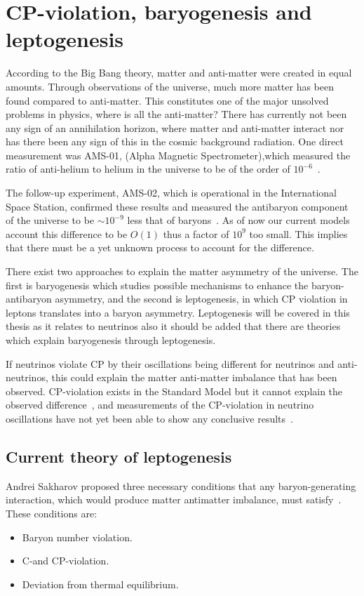 \pagebreak
\section{CP-violation, baryogenesis and leptogenesis}
According to the Big Bang theory, matter and anti-matter were created in equal amounts\cite{14Berry}. Through observations of the universe, much more matter has been found compared to anti-matter. This constitutes one of the major unsolved problems in physics, where is all the anti-matter? There has currently not been any sign of an annihilation horizon, where matter and anti-matter interact nor has there been any sign of this in the cosmic background radiation\cite{14Berry}. One direct measurement was AMS-01, (Alpha Magnetic Spectrometer),which measured the ratio of anti-helium to helium in the universe to be of the order of $10^{-6}$~\cite{15AMS1}. 

The follow-up experiment, AMS-02, which is operational in the International Space Station, confirmed these results and measured the antibaryon component of the universe to be $\sim 10^{-9}$ less that of baryons~\cite{16AMS2}. As of now our current models account this difference to be $O(1)$ thus a factor of $10^9$ too small\cite{49Matter}. This implies that there must be a yet unknown process to account for the difference.

There exist two approaches to explain the matter asymmetry of the universe. The first is baryogenesis which studies possible mechanisms to enhance the baryon-antibaryon asymmetry, and the second is leptogenesis, in which CP violation in leptons translates into a baryon asymmetry. Leptogenesis will be covered in this thesis as it relates to neutrinos also it should be added that there are theories which explain baryogenesis through leptogenesis.

If neutrinos violate CP by their oscillations being different for neutrinos and anti-neutrinos, this could explain the matter anti-matter imbalance that has been observed. CP-violation exists in the Standard Model but it cannot explain the observed difference~\cite{3Peskin}, and measurements of the CP-violation in neutrino oscillations have not yet been able to show any conclusive results~\cite{17Gonzalez}.

\subsection{Current theory of leptogenesis}
Andrei Sakharov proposed three necessary conditions that any baryon-generating interaction, which would produce matter antimatter imbalance, must satisfy~\cite{37Sakharov}. These conditions are:
\begin{itemize}
\item Baryon number violation.
\item C-and CP-violation.
\item Deviation from thermal equilibrium.
\end{itemize}


